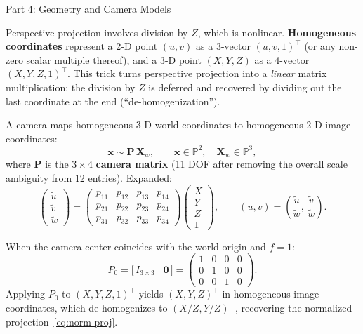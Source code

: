 \documentclass[letterpaper]{article}
\begin{document}
\begin{notes}{Part 4: Geometry and Camera Models}


Perspective projection involves division by $Z$, which is nonlinear.
\textbf{Homogeneous coordinates} represent a 2-D point $(u,v)$ as a
3-vector $(u, v, 1)^\top$ (or any non-zero scalar multiple thereof), and
a 3-D point $(X,Y,Z)$ as a 4-vector $(X, Y, Z, 1)^\top$.  This trick
turns perspective projection into a \emph{linear} matrix multiplication:
the division by $Z$ is deferred and recovered by dividing out the last
coordinate at the end (``de-homogenization'').


A camera maps homogeneous 3-D world coordinates to homogeneous 2-D image
coordinates:
\begin{equation}
  \mathbf{x} \sim \mathbf{P}\,\mathbf{X}_w,
  \qquad
  \mathbf{x} \in \mathbb{P}^2,\quad \mathbf{X}_w \in \mathbb{P}^3,
\end{equation}
where $\mathbf{P}$ is the $3\times 4$ \textbf{camera matrix} (11 DOF after
removing the overall scale ambiguity from 12 entries).  Expanded:
\[
\begin{pmatrix}
    \tilde{u} \\ \tilde{v} \\ \tilde{w}
\end{pmatrix}
=
\begin{pmatrix}
    p_{11} & p_{12} & p_{13} & p_{14} \\
    p_{21} & p_{22} & p_{23} & p_{24} \\
    p_{31} & p_{32} & p_{33} & p_{34}
\end{pmatrix}
\begin{pmatrix}
    X \\ Y \\ Z \\ 1
\end{pmatrix},
\qquad
(u,v) = \left(\frac{\tilde{u}}{\tilde{w}},\, \frac{\tilde{v}}{\tilde{w}}\right).
\]


When the camera center coincides with the world origin and $f = 1$:
\begin{equation}
  P_0 = \bigl[\,I_{3\times 3} \mid \mathbf{0}\,\bigr]
      = \begin{pmatrix}
          1 & 0 & 0 & 0 \\
          0 & 1 & 0 & 0 \\
          0 & 0 & 1 & 0
        \end{pmatrix}.
\end{equation}
Applying $P_0$ to $(X, Y, Z, 1)^\top$ yields $(X, Y, Z)^\top$ in homogeneous
image coordinates, which de-homogenizes to $(X/Z, Y/Z)^\top$, recovering
the normalized projection~\eqref{eq:norm-proj}.


\end{notes}
\end{document}
